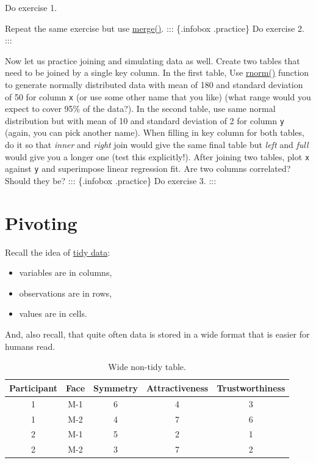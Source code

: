 \documentclass[
]{book}
\providecommand{\tightlist}{%
  \setlength{\itemsep}{0pt}\setlength{\parskip}{0pt}}
\begin{document}
Do exercise 1.

Repeat the same exercise but use \href{https://stat.ethz.ch/R-manual/R-devel/library/base/html/merge.html}{merge()}.
::: \{.infobox .practice\}
Do exercise 2.
:::

Now let us practice joining and simulating data as well. Create two tables that need to be joined by a single key column. In the first table, Use \href{https://stat.ethz.ch/R-manual/R-devel/library/stats/html/Normal.html}{rnorm()} function to generate normally distributed data with mean of 180 and standard deviation of 50 for column \texttt{x} (or use some other name that you like) (what range would you expect to cover 95\% of the data?). In the second table, use same normal distribution but with mean of 10 and standard deviation of 2 for column \texttt{y} (again, you can pick another name). When filling in key column for both tables, do it so that \emph{inner} and \emph{right} join would give the same final table but \emph{left} and \emph{full} would give you a longer one (test this explicitly!). After joining two tables, plot \texttt{x} against \texttt{y} and superimpose linear regression fit. Are two columns correlated? Should they be?
::: \{.infobox .practice\}
Do exercise 3.
:::

\hypertarget{pivoting}{%
\section{Pivoting}\label{pivoting}}

Recall the idea of \protect\hyperlink{tidydata}{tidy data}:

\begin{itemize}
\tightlist
\item
  variables are in columns,
\item
  observations are in rows,
\item
  values are in cells.
\end{itemize}

And, also recall, that quite often data is stored in a wide format that is easier for humans read.

\begin{table}

\caption{\label{tab:unnamed-chunk-199}Wide non-tidy table.}
\centering
\begin{tabular}[t]{c|c|c|c|c}
\hline
Participant & Face & Symmetry & Attractiveness & Trustworthiness\\
\hline
1 & M-1 & 6 & 4 & 3\\
\hline
1 & M-2 & 4 & 7 & 6\\
\hline
2 & M-1 & 5 & 2 & 1\\
\hline
2 & M-2 & 3 & 7 & 2\\
\hline
\end{tabular}
\end{table}
\end{document}
